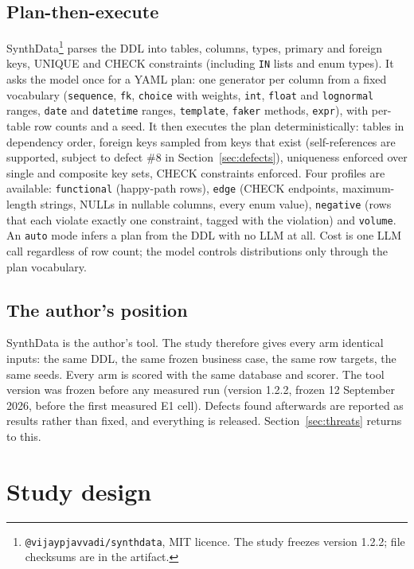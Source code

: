 \documentclass[preprint,12pt]{elsarticle}
\begin{document}
\subsection{Plan-then-execute}
SynthData\footnote{\texttt{@vijaypjavvadi/synthdata}, MIT licence. The study freezes version 1.2.2; file checksums are in the artifact.} parses the DDL into tables, columns, types, primary and foreign keys, UNIQUE and CHECK constraints (including \texttt{IN} lists and enum types). It asks the model once for a YAML plan: one generator per column from a fixed vocabulary (\texttt{sequence}, \texttt{fk}, \texttt{choice} with weights, \texttt{int}, \texttt{float} and \texttt{lognormal} ranges, \texttt{date} and \texttt{datetime} ranges, \texttt{template}, \texttt{faker} methods, \texttt{expr}), with per-table row counts and a seed. It then executes the plan deterministically: tables in dependency order, foreign keys sampled from keys that exist (self-references are supported, subject to defect \#8 in Section~\ref{sec:defects}), uniqueness enforced over single and composite key sets, CHECK constraints enforced. Four profiles are available: \texttt{functional} (happy-path rows), \texttt{edge} (CHECK endpoints, maximum-length strings, NULLs in nullable columns, every enum value), \texttt{negative} (rows that each violate exactly one constraint, tagged with the violation) and \texttt{volume}. An \texttt{auto} mode infers a plan from the DDL with no LLM at all. Cost is one LLM call regardless of row count; the model controls distributions only through the plan vocabulary.

\subsection{The author's position}
SynthData is the author's tool. The study therefore gives every arm identical inputs: the same DDL, the same frozen business case, the same row targets, the same seeds. Every arm is scored with the same database and scorer. The tool version was frozen before any measured run (version 1.2.2, frozen 12 September 2026, before the first measured E1 cell). Defects found afterwards are reported as results rather than fixed, and everything is released. Section~\ref{sec:threats} returns to this.

\section{Study design}
\label{sec:method}
\end{document}
